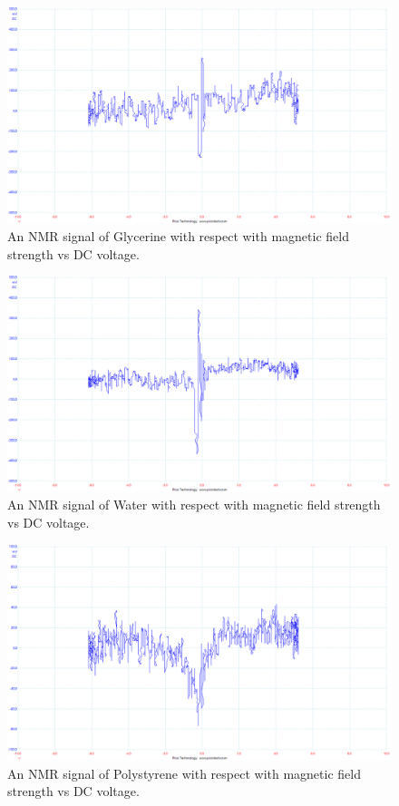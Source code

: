 \documentclass[12pt]{article}
\begin{document}
\begin{figure}[H]
\centering
\includegraphics[scale=0.45]{Images/Report/Part A/1B.png}
\caption{An NMR signal of Glycerine with respect with magnetic field strength vs DC voltage.}
\label{Part 1 1B}
\end{figure}

\begin{figure}[H]
\centering
\includegraphics[scale=0.45]{Images/Report/Part A/2B.png}
\caption{An NMR signal of Water with respect with magnetic field strength vs DC voltage.}
\label{Part 1 2B}
\end{figure}

\begin{figure}[H]
\centering
\includegraphics[scale=0.45]{Images/Report/Part A/3B.png}
\caption{An NMR signal of Polystyrene with respect with magnetic field strength vs DC voltage.}
\label{Part 1 3B}
\end{figure}
\end{document}

